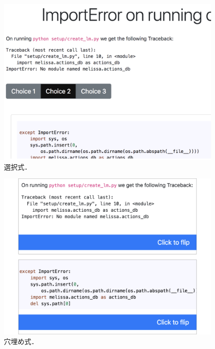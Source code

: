 \begin{figure}[t]
	\centering
  \includegraphics[width=1.0\columnwidth]{multi-choice.png}
  \caption{選択式．}
  \label{fig:flash}
\end{figure}

\begin{figure}[t]
	\centering
  \includegraphics[width=1.0\columnwidth]{flash-card.png}
  \caption{穴埋め式．}
  \label{fig:fill}
\end{figure}



  



